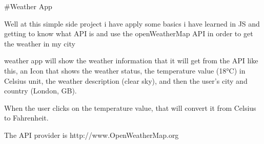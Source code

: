 #Weather App 


Well at this simple side project i have apply some basics i have learned in JS and 
getting to know what API is and use the openWeatherMap API in order to get the weather in my city 

weather app will show the weather information that it will get from the API like this,
an Icon that shows the weather status, the temperature value (18°C) in Celsius unit,
the weather description (clear sky), and then the user's city and country (London, GB).


When the user clicks on the temperature value, that will convert it from Celsius to Fahrenheit.




The API provider is http://www.OpenWeatherMap.org


